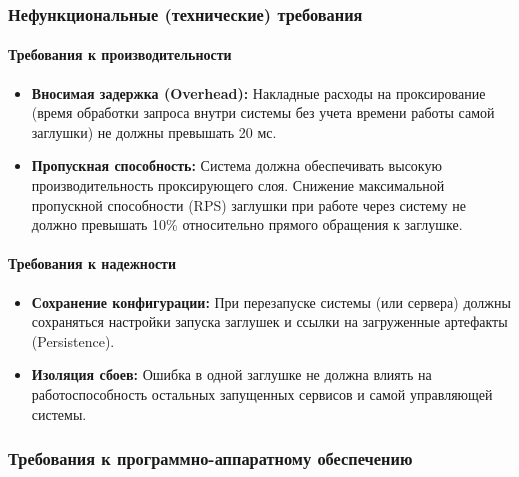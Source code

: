 \documentclass[
]{article}
\begin{document}
\subsubsection{Нефункциональные (технические)
требования}\label{ux43dux435ux444ux443ux43dux43aux446ux438ux43eux43dux430ux43bux44cux43dux44bux435-ux442ux435ux445ux43dux438ux447ux435ux441ux43aux438ux435-ux442ux440ux435ux431ux43eux432ux430ux43dux438ux44f}

\paragraph{Требования к
производительности}\label{ux442ux440ux435ux431ux43eux432ux430ux43dux438ux44f-ux43a-ux43fux440ux43eux438ux437ux432ux43eux434ux438ux442ux435ux43bux44cux43dux43eux441ux442ux438}

\begin{itemize}
\item
  \textbf{Вносимая задержка (Overhead):} Накладные расходы на
  проксирование (время обработки запроса внутри системы без учета
  времени работы самой заглушки) не должны превышать 20 мс.
\item
  \textbf{Пропускная способность:} Система должна обеспечивать высокую
  производительность проксирующего слоя. Снижение максимальной
  пропускной способности (RPS) заглушки при работе через систему не
  должно превышать 10\% относительно прямого обращения к заглушке.
\end{itemize}

\paragraph{Требования к
надежности}\label{ux442ux440ux435ux431ux43eux432ux430ux43dux438ux44f-ux43a-ux43dux430ux434ux435ux436ux43dux43eux441ux442ux438}

\begin{itemize}
\item
  \textbf{Сохранение конфигурации:} При перезапуске системы (или
  сервера) должны сохраняться настройки запуска заглушек и ссылки на
  загруженные артефакты (Persistence).
\item
  \textbf{Изоляция сбоев:} Ошибка в одной заглушке не должна влиять на
  работоспособность остальных запущенных сервисов и самой управляющей
  системы.
\end{itemize}

\subsubsection{Требования к программно-аппаратному
обеспечению}\label{ux442ux440ux435ux431ux43eux432ux430ux43dux438ux44f-ux43a-ux43fux440ux43eux433ux440ux430ux43cux43cux43dux43e-ux430ux43fux43fux430ux440ux430ux442ux43dux43eux43cux443-ux43eux431ux435ux441ux43fux435ux447ux435ux43dux438ux44e}
\end{document}

